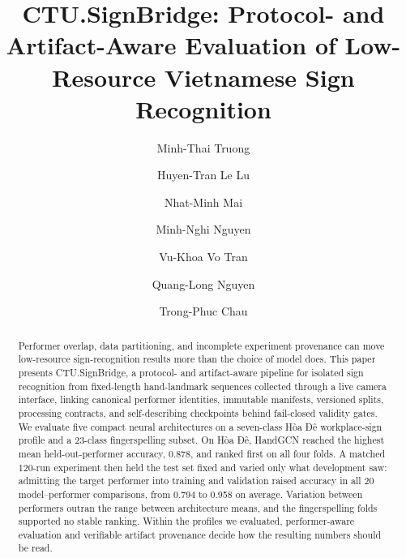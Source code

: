 \documentclass[runningheads]{llncs}
\begin{document}
\title{CTU.SignBridge: Protocol- and Artifact-Aware Evaluation of
Low-Resource Vietnamese Sign Recognition}


\author{
Minh-Thai Truong
\and
Huyen-Tran Le Lu
\and
Nhat-Minh Mai
\and
Minh-Nghi Nguyen
\and
Vu-Khoa Vo Tran
\and
Quang-Long Nguyen
\and
Trong-Phuc Chau
}



\maketitle

\begin{abstract}
Performer overlap, data partitioning, and incomplete experiment provenance can move low-resource sign-recognition results more than the choice of model does. This paper presents CTU.SignBridge, a protocol- and artifact-aware pipeline for isolated sign recognition from fixed-length hand-landmark sequences collected through a live camera interface, linking canonical performer identities, immutable manifests, versioned splits, processing contracts, and self-describing checkpoints behind fail-closed validity gates. We evaluate five compact neural architectures on a seven-class Hòa Đê workplace-sign profile and a 23-class fingerspelling subset. On Hòa Đê, HandGCN reached the highest mean held-out-performer accuracy, 0.878, and ranked first on all four folds. A matched 120-run experiment then held the test set fixed and varied only what development saw: admitting the target performer into training and validation raised accuracy in all 20 model--performer comparisons, from 0.794 to 0.958 on average. Variation between performers outran the range between architecture means, and the fingerspelling folds supported no stable ranking. Within the profiles we evaluated, performer-aware evaluation and verifiable artifact provenance decide how the resulting numbers should be read.

\end{abstract}
\end{document}
